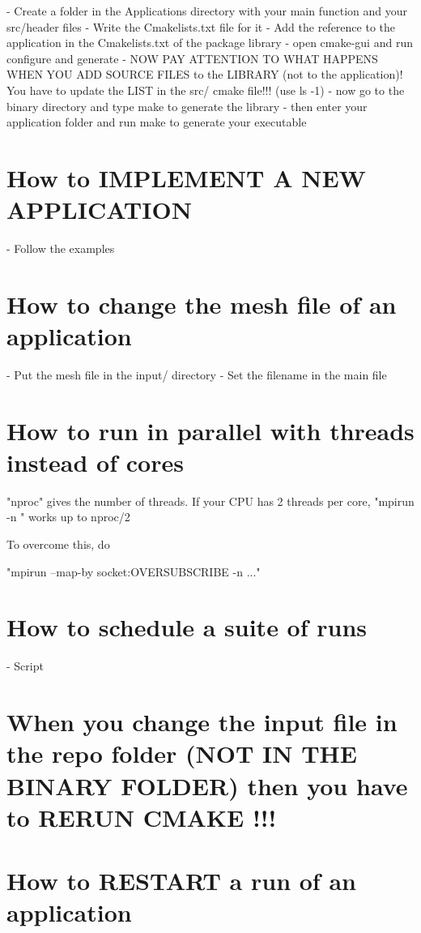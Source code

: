 \documentclass[10pt]{book}
\begin{document}
- Create a folder in the Applications directory with your main function and your src/header files
- Write the Cmakelists.txt file for it
- Add the reference to the application in the Cmakelists.txt of the package library
- open cmake-gui and run configure and generate
- NOW PAY ATTENTION TO WHAT HAPPENS WHEN YOU ADD SOURCE FILES to the LIBRARY (not to the application)! You have to update the LIST in the src/ cmake file!!! (use ls -1)
- now go to the binary directory and type make to generate the library
- then enter your application folder and run make to generate your executable

 \section{How to IMPLEMENT A NEW APPLICATION}

- Follow the examples

\section{How to change the mesh file of an application}

- Put the mesh file in the input/ directory
- Set the filename in the main file

 \section{How to run in parallel with threads instead of cores}


"nproc" gives the number of threads. If your CPU has 2 threads per core, "mpirun -n " works up to nproc/2

To overcome this, do

"mpirun --map-by socket:OVERSUBSCRIBE -n ..."


 \section{How to schedule a suite of runs}

- Script

 \section{When you change the input file in the repo folder (NOT IN THE BINARY FOLDER) then you have to RERUN CMAKE !!!}
 

 \section{How to RESTART a run of an application}
 
\end{document}
